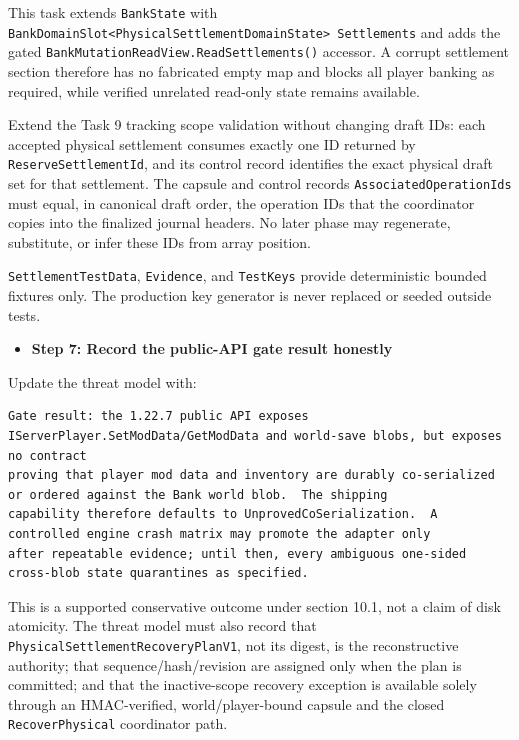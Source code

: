 \documentclass[
  10pt,
  letterpaper,
]{article}
\newcommand{\passthrough}[1]{#1}
\providecommand{\tightlist}{%
  \setlength{\itemsep}{0pt}\setlength{\parskip}{0pt}}
\begin{document}
This task extends \passthrough{\lstinline!BankState!} with
\texttt{BankDomainSlot\textless{}}\allowbreak{}\texttt{PhysicalSettlementDomainState\textgreater{}}\allowbreak{}\texttt{\ }\allowbreak{}\texttt{Settlements}
and adds the gated
\texttt{BankMutationReadView.}\allowbreak{}\texttt{ReadSettlements(}\allowbreak{}\texttt{)}\allowbreak{}
accessor. A corrupt settlement section therefore has no fabricated empty
map and blocks all player banking as required, while verified unrelated
read-only state remains available.

Extend the Task 9 tracking scope validation without changing draft IDs:
each accepted physical settlement consumes exactly one ID returned by
\passthrough{\lstinline!ReserveSettlementId!}, and its control record
identifies the exact physical draft set for that settlement. The capsule
and control record\textquotesingle s
\passthrough{\lstinline!AssociatedOperationIds!} must equal, in
canonical draft order, the operation IDs that the coordinator copies
into the finalized journal headers. No later phase may regenerate,
substitute, or infer these IDs from array position.

\passthrough{\lstinline!SettlementTestData!},
\passthrough{\lstinline!Evidence!}, and
\passthrough{\lstinline!TestKeys!} provide deterministic bounded
fixtures only. The production key generator is never replaced or seeded
outside tests.

\begin{itemize}
\tightlist
\item[$\square$]
  \textbf{Step 7: Record the public-API gate result honestly}
\end{itemize}

Update the threat model with:

\begin{lstlisting}
Gate result: the 1.22.7 public API exposes IServerPlayer.SetModData/GetModData and world-save blobs, but exposes no contract
proving that player mod data and inventory are durably co-serialized or ordered against the Bank world blob.  The shipping
capability therefore defaults to UnprovedCoSerialization.  A controlled engine crash matrix may promote the adapter only
after repeatable evidence; until then, every ambiguous one-sided cross-blob state quarantines as specified.
\end{lstlisting}

This is a supported conservative outcome under section 10.1, not a claim
of disk atomicity. The threat model must also record that
\texttt{PhysicalSettlementRecoveryPlanV1}, not its digest, is the
reconstructive authority; that
sequence/\allowbreak{}hash/\allowbreak{}revision are assigned only when
the plan is committed; and that the inactive-scope recovery exception is
available solely through an HMAC-verified, world/player-bound capsule
and the closed \passthrough{\lstinline!RecoverPhysical!} coordinator
path.
\end{document}
